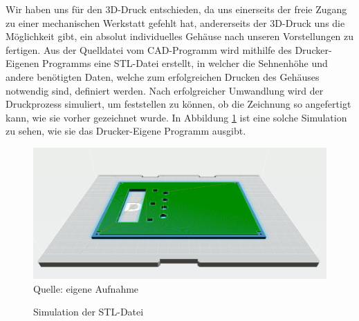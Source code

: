 \label{3D-Druck}

Wir haben uns für den 3D-Druck entschieden, da uns einerseits der freie Zugang zu einer mechanischen Werkstatt gefehlt hat, andererseits der 3D-Druck uns die Möglichkeit gibt, ein absolut individuelles Gehäuse nach unseren Vorstellungen zu fertigen. Aus der Quelldatei vom \ac{CAD}-Programm wird mithilfe des Drucker-Eigenen Programms eine STL-Datei erstellt, in welcher die Sehnenhöhe und andere benötigten Daten, welche zum erfolgreichen Drucken des Gehäuses notwendig sind, definiert werden. Nach erfolgreicher Umwandlung wird der Druckprozess simuliert, um feststellen zu können, ob die Zeichnung so angefertigt kann, wie sie vorher gezeichnet wurde. In Abbildung \ref{fig:SimSTL} ist eine solche Simulation zu sehen, wie sie das Drucker-Eigene Programm ausgibt.

\begin{figure}[!hbt]
	\centering
	\includegraphics[width=0.9\linewidth]{Images/SimSTL}
	\footnotesize \\Quelle: eigene Aufnahme
	\caption{Simulation der \ac{STL}-Datei}
	\label{fig:SimSTL}
\end{figure}
